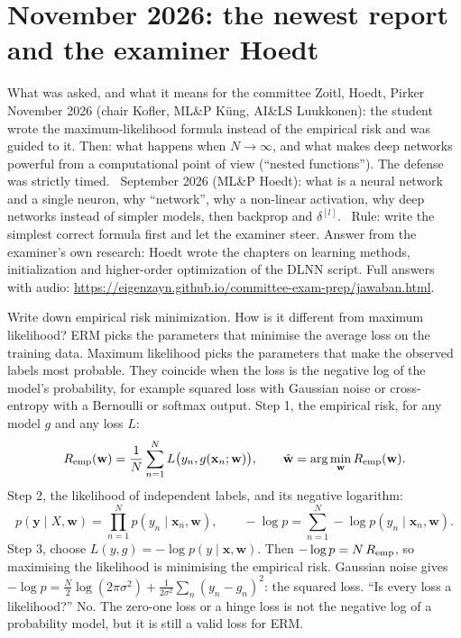 \section{November 2026: the newest report and the examiner Hoedt}

\begin{summary}{What was asked, and what it means for the committee Zoitl, Hoedt, Pirker}
\textsf{November 2026} (chair Kofler, ML\&P Küng, AI\&LS Luukkonen): the student wrote the maximum-likelihood
formula instead of the empirical risk and was guided to it. Then: what happens when $N\to\infty$, and what makes
deep networks powerful from a computational point of view (``nested functions''). The defense was strictly
timed. \
\textsf{September 2026} (ML\&P Hoedt): what is a neural network and a single neuron, why ``network'', why a
non-linear activation, why deep networks instead of simpler models, then backprop and $\delta^{[l]}$. \
\textsf{Rule:} write the simplest correct formula first and let the examiner steer. Answer from the examiner's
own research: Hoedt wrote the chapters on learning methods, initialization and higher-order optimization of the
DLNN script. Full answers with audio: \url{https://eigenzayn.github.io/committee-exam-prep/jawaban.html}.
\end{summary}

\begin{qabox}[Küng]{\asked Write down empirical risk minimization. How is it different from maximum likelihood?}
\ans ERM picks the parameters that minimise the average loss on the training data. Maximum likelihood picks
the parameters that make the observed labels most probable. They coincide when the loss is the negative log
of the model's probability, for example squared loss with Gaussian noise or cross-entropy with a Bernoulli
or softmax output.
\formula Step 1, the empirical risk, for any model $g$ and any loss $L$:
\[ R_{\mathrm{emp}}(\mathbf w)=\frac1N\sum_{n=1}^N L\bigl(y_n,g(\mathbf x_n;\mathbf w)\bigr),\qquad \hat{\mathbf w}=\arg\min_{\mathbf w}R_{\mathrm{emp}}(\mathbf w). \]
Step 2, the likelihood of independent labels, and its negative logarithm:
\[ p(\mathbf y\mid X,\mathbf w)=\prod_{n=1}^N p(y_n\mid\mathbf x_n,\mathbf w),\qquad
-\log p=\sum_{n=1}^N -\log p(y_n\mid\mathbf x_n,\mathbf w). \]
Step 3, choose $L(y,g)=-\log p(y\mid\mathbf x,\mathbf w)$. Then $-\log p = N\,R_{\mathrm{emp}}$, so maximising the likelihood
is minimising the empirical risk. Gaussian noise gives $-\log p=\frac N2\log(2\pi\sigma^2)+\frac1{2\sigma^2}\sum_n(y_n-g_n)^2$:
the squared loss.
\follow ``Is every loss a likelihood?'' No. The zero-one loss or a hinge loss is not the negative log of a
probability model, but it is still a valid loss for ERM.
\end{qabox}

